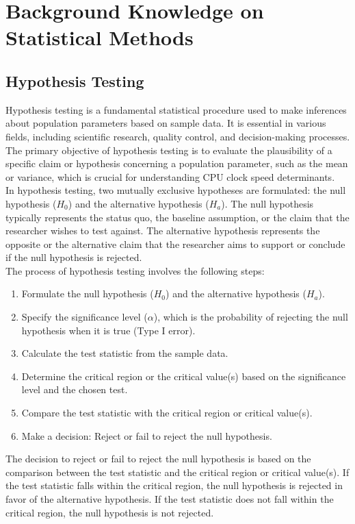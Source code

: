 \section{Background Knowledge on Statistical Methods}
\subsection{Hypothesis Testing}

Hypothesis testing is a fundamental statistical procedure used to make inferences about population parameters based on sample data. It is essential in various fields, including scientific research, quality control, and decision-making processes. The primary objective of hypothesis testing is to evaluate the plausibility of a specific claim or hypothesis concerning a population parameter, such as the mean or variance, which is crucial for understanding CPU clock speed determinants.\\

In hypothesis testing, two mutually exclusive hypotheses are formulated: the null hypothesis ($H_0$) and the alternative hypothesis ($H_a$). The null hypothesis typically represents the status quo, the baseline assumption, or the claim that the researcher wishes to test against. The alternative hypothesis represents the opposite or the alternative claim that the researcher aims to support or conclude if the null hypothesis is rejected.\\

The process of hypothesis testing involves the following steps:
\begin{enumerate}
    \item Formulate the null hypothesis ($H_0$) and the alternative hypothesis ($H_a$).
    \item Specify the significance level ($\alpha$), which is the probability of rejecting the null hypothesis when it is true (Type I error).
    \item Calculate the test statistic from the sample data.
    \item Determine the critical region or the critical value(s) based on the significance level and the chosen test.
    \item Compare the test statistic with the critical region or critical value(s).
    \item Make a decision: Reject or fail to reject the null hypothesis.
\end{enumerate}

The decision to reject or fail to reject the null hypothesis is based on the comparison between the test statistic and the critical region or critical value(s). If the test statistic falls within the critical region, the null hypothesis is rejected in favor of the alternative hypothesis. If the test statistic does not fall within the critical region, the null hypothesis is not rejected.\\

